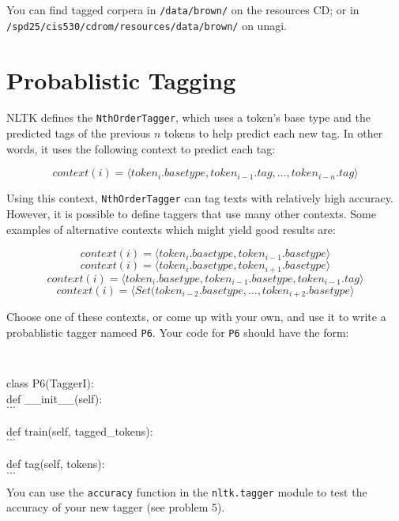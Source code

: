 \documentclass{cis530}
\begin{document}
You can find tagged corpera in \texttt{/data/brown/} on the
resources CD; or in
\texttt{/spd25/cis530/cdrom/resources/data/brown/} on unagi.

\section{Probablistic Tagging}

NLTK defines the \texttt{NthOrderTagger}, which uses a token's base
type and the predicted tags of the previous $n$ tokens to help predict
each new tag.  In other words, it uses the following context to
predict each tag:

$$context(i) = \langle token_i.basetype, token_{i-1}.tag, \ldots, token_{i-n}.tag\rangle$$

Using this context, \texttt{NthOrderTagger} can tag texts with
relatively high accuracy.  However, it is possible to define taggers
that use many other contexts.  Some examples of alternative contexts
which might yield good results are:

$$context(i) = \langle token_i.basetype, token_{i-1}.basetype\rangle$$
$$context(i) = \langle token_i.basetype, token_{i+1}.basetype\rangle$$
$$context(i) = \langle token_i.basetype, token_{i-1}.basetype, token_{i-1}.tag\rangle$$
$$context(i) = \langle Set(token_{i-2}.basetype, \ldots, token_{i+2}.basetype\rangle$$

Choose one of these contexts, or come up with your own, and use it to
write a probablistic tagger nameed \texttt{P6}.  Your code for
\texttt{P6} should have the form:

{\tt
\begin{tabbing}
class P6(TaggerI):\\
\qquad def \_\_init\_\_(self):\\
\qquad\qquad $\ldots$\\
\\
\qquad def train(self, tagged\_tokens):\\
\qquad\qquad $\ldots$\\
\\
\qquad def tag(self, tokens):\\
\qquad\qquad $\ldots$
\end{tabbing}
}

You can use the \texttt{accuracy} function in the \texttt{nltk.tagger}
module to test the accuracy of your new tagger (see problem 5).
\end{document}
